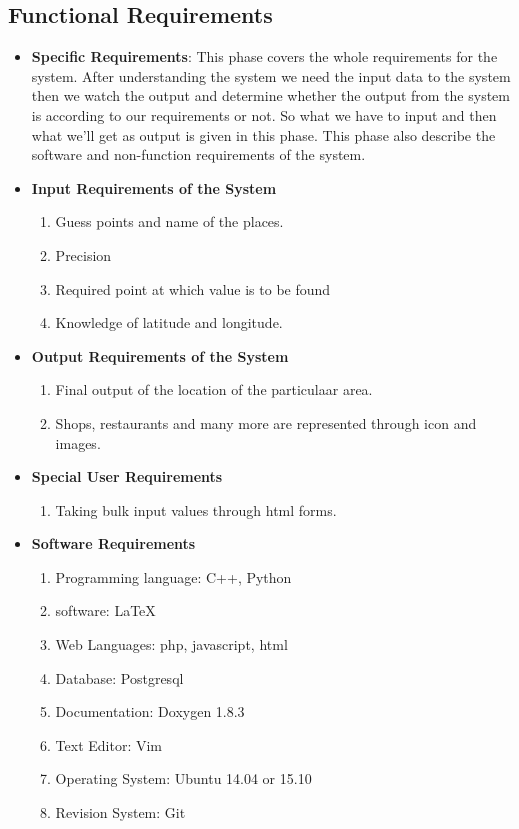 \subsection{Functional Requirements}
\begin{itemize}
\item {\bf Specific Requirements}: This phase covers the whole requirements 
for the system. After understanding the system we need the input data 
to the system then we watch the output and determine whether the output 
from the system is according to our requirements or not. So what we have 
to input and then what we'll get as output is given in this phase. This 
phase also describe the software and non-function requirements of the 
system.
\item {\bf Input Requirements of the System}
\begin{enumerate} 
\item Guess points and name of the places.
\item Precision
\item Required point at which value is to be found
\item Knowledge of latitude and longitude.
\end{enumerate}
\vskip 0.5cm
\item {\bf Output Requirements of the System}
\begin{enumerate} 
\item Final output of the location of the particulaar area.
\item Shops, restaurants and many more are represented through icon and images.
\end{enumerate}
\vskip 0.5cm
\item {\bf Special User Requirements}
\begin{enumerate} 
\item Taking bulk input values through html forms.
\end{enumerate}
\vskip 0.5cm
\item {\bf Software Requirements}
\begin{enumerate} 
\item Programming language: C++, Python
\item software: \LaTeX{}
\item Web Languages: php, javascript, html
\item Database: Postgresql 
\item Documentation: Doxygen 1.8.3
\item Text Editor: Vim
\item Operating System: Ubuntu 14.04 or 15.10
\item Revision System: Git


\end{enumerate}
\end{itemize}
